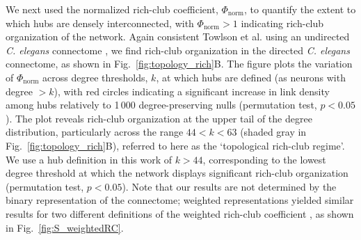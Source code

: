 \documentclass[10pt,letterpaper]{article}
\begin{document}
We next used the normalized rich-club coefficient, $\Phi_\mathrm{norm}$, to quantify the extent to which hubs are densely interconnected, with $\Phi_\mathrm{norm} > 1$ indicating rich-club organization of the network.
Again consistent Towlson et al. using an undirected \emph{C. elegans} connectome \cite{Towlson:2013gf}, we find rich-club organization in the directed \emph{C. elegans} connectome, as shown in Fig.~\ref{fig:topology_rich}B.
The figure plots the variation of $\Phi_\mathrm{norm}$ across degree thresholds, $k$, at which hubs are defined (as neurons with degree $>k$), with red circles indicating a significant increase in link density among hubs relatively to 1\,000 degree-preserving nulls (permutation test, $p < 0.05$).
The plot reveals rich-club organization at the upper tail of the degree distribution, particularly across the range $44 < k < 63$ (shaded gray in Fig.~\ref{fig:topology_rich}B), referred to here as the `topological rich-club regime'.
We use a hub definition in this work of $k > 44$, corresponding to the lowest degree threshold at which the network displays significant rich-club organization (permutation test, $p < 0.05$).
Note that our results are not determined by the binary representation of the connectome; weighted representations yielded similar results for two different definitions of the weighted rich-club coefficient \cite{Opsahl2008}, as shown in Fig.~\ref{fig:S_weightedRC}.
\end{document}
